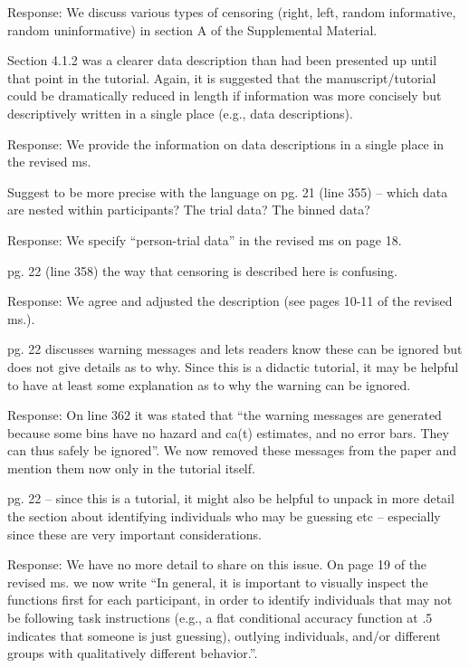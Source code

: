\documentclass[
]{article}
\renewenvironment{quote}{\begin{leftbar}}{\end{leftbar}}
\begin{document}
Response: We discuss various types of censoring (right, left, random
informative, random uninformative) in section A of the Supplemental
Material.

\begin{quote}
Section 4.1.2 was a clearer data description than had been presented up
until that point in the tutorial. Again, it is suggested that the
manuscript/tutorial could be dramatically reduced in length if
information was more concisely but descriptively written in a single
place (e.g., data descriptions).
\end{quote}

Response: We provide the information on data descriptions in a single
place in the revised ms.

\begin{quote}
Suggest to be more precise with the language on pg. 21 (line 355) --
which data are nested within participants? The trial data? The binned
data?
\end{quote}

Response: We specify ``person-trial data'' in the revised ms on page 18.

\begin{quote}
pg. 22 (line 358) the way that censoring is described here is confusing.
\end{quote}

Response: We agree and adjusted the description (see pages 10-11 of the
revised ms.).

\begin{quote}
pg. 22 discusses warning messages and lets readers know these can be
ignored but does not give details as to why. Since this is a didactic
tutorial, it may be helpful to have at least some explanation as to why
the warning can be ignored.
\end{quote}

Response: On line 362 it was stated that ``the warning messages are
generated because some bins have no hazard and ca(t) estimates, and no
error bars. They can thus safely be ignored''. We now removed these
messages from the paper and mention them now only in the tutorial
itself.

\begin{quote}
pg. 22 -- since this is a tutorial, it might also be helpful to unpack
in more detail the section about identifying individuals who may be
guessing etc -- especially since these are very important
considerations.
\end{quote}

Response: We have no more detail to share on this issue. On page 19 of
the revised ms. we now write ``In general, it is important to visually
inspect the functions first for each participant, in order to identify
individuals that may not be following task instructions (e.g., a flat
conditional accuracy function at .5 indicates that someone is just
guessing), outlying individuals, and/or different groups with
qualitatively different behavior.''.
\end{document}
